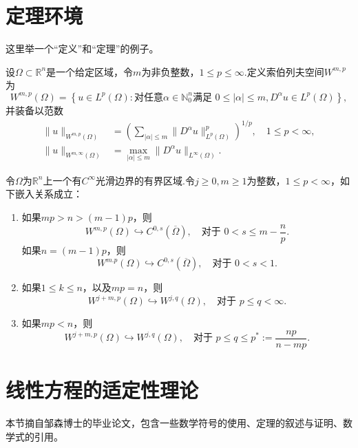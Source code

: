 \section{定理环境}

这里举一个“定义”和“定理”的例子。

\begin{definition}
设$\Omega\subset\mathbb{R}^n$是一个给定区域，令$m$为非负整数，$1\leq p\leq \infty$.定义索伯列夫空间$W^{m,p}$为
$$
W^{m,p}(\Omega)=\left\{u\in L^p(\Omega): \text{对任意}\alpha\in \mathbb{N}_{0}^n\text{满足 }0\leq |\alpha|\leq m, D^{\alpha}u\in L^p(\Omega) \right\},
$$
并装备以范数
\begin{equation*}
\begin{aligned}
\|u\|_{W^{m,p}(\Omega)} &= \left( \sum_{|\alpha|\leq m} \|D^{\alpha}u\|_{L^p(\Omega)}^p \right)^{1/p},\quad 1\leq p <\infty, \label{eq:sobolev-norm}\\
\|u\|_{W^{m,\infty}(\Omega)} &= \max_{|\alpha|\leq m} \|D^{\alpha}u\|_{L^{\infty}(\Omega)}.
\end{aligned}
\end{equation*}
\end{definition}


\begin{theorem}\label{thm:sobolev-embedding}
令$\Omega$为$\mathbb{R}^n$上一个有$C^{\infty}$光滑边界的有界区域.令$j\geq 0,m\geq 1$为整数，$1\leq p<\infty$，如下嵌入关系成立：
\begin{enumerate}
\item 如果$mp>n>(m-1)p$，则
$$
W^{m,p}(\Omega) \hookrightarrow C^{0,s}(\overline{\Omega}), \quad \text{对于 }0<s\leq m-\frac{n}{p}.
$$
如果$n=(m-1)p$，则
$$
W^{m.p}(\Omega) \hookrightarrow C^{0,s}(\overline{\Omega}), \quad \text{对于 }0<s<1.
$$
\item 如果$1\leq k\leq n$，以及$mp=n$，则
$$
W^{j+m,p}(\Omega)\hookrightarrow W^{j,q}(\Omega), \quad \text{对于 }p\leq q < \infty.
$$
\item 如果$mp<n$，则
$$
W^{j+m,p}(\Omega) \hookrightarrow W^{j,q}(\Omega), \quad \text{对于 }p\leq q \leq p^{*}:=\frac{np}{n-mp}.
$$
\end{enumerate}
\end{theorem}



\section{线性方程的适定性理论}\label{sec:linear-wellposedness}
本节摘自邹森博士的毕业论文，包含一些数学符号的使用、定理的叙述与证明、数学式的引用。

